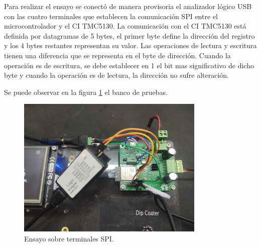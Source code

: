  





Para realizar el ensayo se conectó de manera provisoria el analizador lógico USB con las cuatro terminales que establecen la comunicación SPI entre el microcontrolador y el CI TMC5130. La comunicación con el CI TMC5130 está definida por datagramas de 5 bytes, el primer byte define la dirección del registro y los 4 bytes restantes representan su valor. Las operaciones de lectura y escritura tienen una diferencia que se representa en el byte de dirección. Cuando la operación es de escritura, se debe establecer en 1 el bit mas significativo de dicho byte y cuando la operación es de lectura, la dirección no sufre alteración.

Se puede observar en la figura \ref{fig:ensayo_spi} el banco de pruebas.

\begin{figure}[h!]
\centering 
\includegraphics[width=0.8\textwidth]{./Figures/ensayo_spi.jpeg}
\caption{Ensayo sobre terminales SPI.}
\label{fig:ensayo_spi}
\end{figure}

